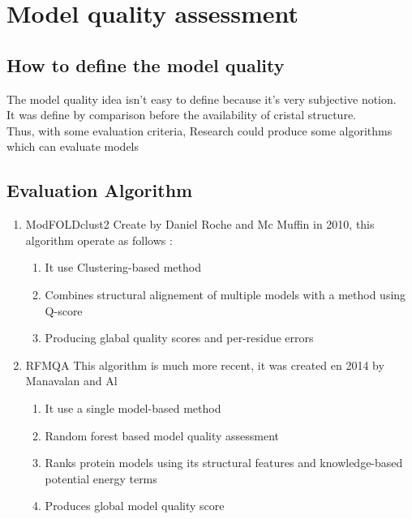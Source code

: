 \section{Model quality assessment}
\subsection{How to define the model quality}
   The model quality idea isn't easy to define because it's very subjective notion.\\
   It was define by comparison before the availability of cristal structure.\\

   Thus, with some evaluation criteria, Research could produce some algorithms which can evaluate models

\subsection{Evaluation Algorithm}
\begin{enumerate}
	\item ModFOLDclust2
          Create by Daniel Roche and Mc Muffin in 2010, this algorithm operate as follows :
		\begin{enumerate}
                \item It use Clustering-based method
                \item Combines structural alignement of multiple models with a method using Q-score
                \item Producing glabal quality scores and per-residue errors
		\end{enumerate}
	\item RFMQA 
          This algorithm is much more recent, it was created en 2014 by Manavalan and Al
		\begin{enumerate}
                  \item It use a single model-based method
                  \item Random forest based model quality assessment
                  \item Ranks protein models using its structural features and knowledge-based potential energy terms
                  \item Produces global model quality score
		\end{enumerate}
\end{enumerate}



